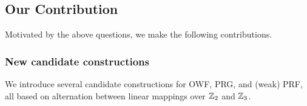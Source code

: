 
\subsection{Our Contribution}


Motivated by the above questions, we make the following contributions.

\iffalse
\paragraph{\bf \textnormal{OT} and \textnormal{VOLE} friendliness}.
    MPC protocols in the preprocessing modelcan take advantage of input-independent correlated randomness to better handle nonlinear gates~\cite{Beaver,BDOZ,SPDZ,PowerOfCorrelatedRandomness,TinyTables,BGI19}. However, some kinds of correlated randomness are better than other. Recent work~\cite{?} for instance, has shown how pseudorandom correlation generators (PCGs) can be used to generate millions of ``OT'' and ``VOLE'' correlations with very low and computation costs. Furthermore, it is not necessary to store all of these correlations; they can stored in a compressed form, and expanded only when needed~\cite{?}. Roughly speaking, an OT correlation is useful for evaluating a ``simple'' nonlinear gates (such as Boolean AND) and a VOLE correlation is useful for scalar-vector products. We would like to maximize the potential benefit from these recent techniques.


\mahimna{still writing}
\fi


\subsubsection{New candidate constructions}
We introduce several candidate constructions for OWF, PRG, and (weak) PRF, all based on alternation between linear mappings over $\mathbb{Z}_2$ and $\mathbb{Z}_3$.

